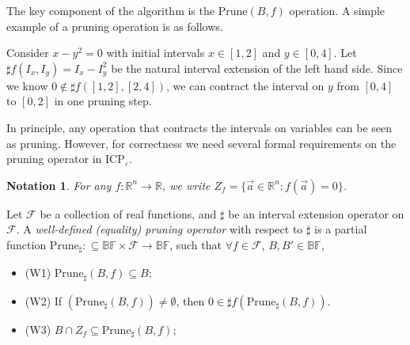 \documentclass[envcountsect]{llncs}
\newtheorem{notation}[theorem]{Notation}
\begin{document}
The key component of the algorithm is the $\mathrm{Prune}(B, f)$ operation. A simple example of a pruning operation is as follows.
\begin{example}
Consider $x-y^2 = 0$ with initial intervals $x\in [1,2]$ and $y\in [0,4]$. Let $\sharp f(I_x,I_y) = I_x-I_y^2$ be the natural interval extension of the left hand side. Since we know $0\not\in \sharp f([1,2],[2, 4])$, we can contract the interval on $y$ from $[0,4]$ to $[0,2]$ in one pruning step.  
\end{example}
In principle, any operation that contracts the intervals on variables can be seen as pruning. However, for correctness we need several formal requirements on the pruning operator in ICP$_{\varepsilon}$. 
\begin{notation}
For any $f:\mathbb{R}^n\rightarrow \mathbb{R}$, we write $Z_f=\{\vec a\in \mathbb{R}^n: f(\vec a)=0\}$.
\end{notation}
\begin{definition}\label{well}
Let $\mathcal{F}$ be a collection of real functions, and $\sharp$ be an interval extension operator on $\mathcal{F}$. A {\em well-defined (equality) pruning operator} with respect to $\sharp$ is a partial function $\mathrm{Prune}_{\sharp} : \subseteq \mathbb{BF}\times \mathcal{F}\rightarrow \mathbb{BF}$, such that $\forall f\in \mathcal{F}$, $B,B'\in \mathbb{BF}$, 
\begin{itemize}
\item (W1) $\mathrm{Prune}_{\sharp}(B, f)\subseteq B$;
\item (W2) If $(\mathrm{Prune}_{\sharp}(B,f))\neq \emptyset$, then $0\in \sharp f(\mathrm{Prune}_{\sharp}(B,f))$. 
\item (W3) $B \cap Z_f \subseteq \mathrm{Prune}_{\sharp}(B, f)$;
\end{itemize}
\end{definition}
\end{document}
